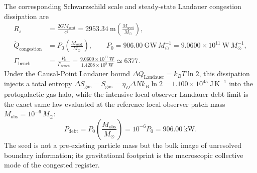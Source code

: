 \documentclass[11pt,letterpaper]{article}
\theoremstyle{plain}
\newcommand{\msun}{M_{\odot}}
\begin{document}
The corresponding Schwarzschild scale and steady-state Landauer congestion dissipation are
\begin{align}
\label{eq:mass-congestion-radius-power}
 R_s
 &=\frac{2GM_{\text{seed}}}{c^2}
 =2953.34\ \mathrm{m}
 \left(\frac{M_{\text{seed}}}{\msun}\right),
 \\
 \dot Q_{\text{congestion}}
 &=P_0\left(\frac{M_{\text{seed}}}{\msun}\right),
 \qquad P_0 = 906.00\ \mathrm{GW}\,\msun^{-1} = 9.0600\times10^{11}\ \mathrm{W}\,\msun^{-1},
 \\
 \Gamma_{\text{bench}}
 &=\frac{P_0}{P_{\text{bench}}}
 =\frac{9.0600\times10^{11}\ \mathrm{W}}{1.4208\times10^8\ \mathrm{W}}
 \simeq6377.
\end{align}
Under the Causal-Point Landauer bound $\Delta Q_{\text{Landauer}} = k_B T \ln 2$, this dissipation injects a total entropy $\Delta S_{\text{gas}} = S_{\text{gas}} = \eta_D \Delta N k_B \ln 2 = 1.100\times10^{45}\ \mathrm{J\,K^{-1}}$ into the protogalactic gas halo, while the intensive local observer Landauer debt limit is the exact same law evaluated at the reference local observer patch mass $M_{\text{obs}} = 10^{-6}\,\msun$:
\begin{equation}
\label{eq:local-observer-debt-reconciliation}
P_{\text{debt}} = P_0\left(\frac{M_{\text{obs}}}{\msun}\right) = 10^{-6} P_0 = 906.00\ \mathrm{kW}.
\end{equation}
The seed is not a pre-existing particle mass but the bulk image of unresolved
boundary information; its gravitational footprint is the macroscopic
collective mode of the congested register.
\end{document}
